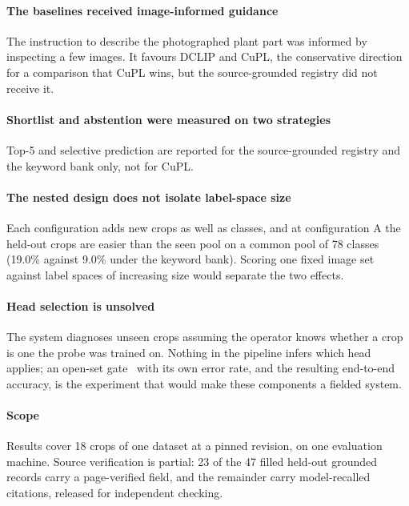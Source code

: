 \documentclass[a4paper,fleqn]{cas-dc}
\begin{document}
\paragraph{The baselines received image-informed guidance} The instruction to describe the photographed
plant part was informed by inspecting a few images. It favours DCLIP and CuPL, the conservative
direction for a comparison that CuPL wins, but the source-grounded registry did not receive it.

\paragraph{Shortlist and abstention were measured on two strategies} Top-5 and selective prediction
are reported for the source-grounded registry and the keyword bank only, not for CuPL.

\paragraph{The nested design does not isolate label-space size} Each configuration adds new crops as
well as classes, and at configuration A the held-out crops are easier than the seen pool on a common
pool of 78 classes (19.0\% against 9.0\% under the keyword bank). Scoring one fixed image set against
label spaces of increasing size would separate the two effects.

\paragraph{Head selection is unsolved} The system diagnoses unseen crops assuming the operator knows
whether a crop is one the probe was trained on. Nothing in the pipeline infers which head applies; an
open-set gate~\citep{scheirer2013openset} with its own error rate, and the resulting end-to-end
accuracy, is the experiment that would make these components a fielded system.

\paragraph{Scope} Results cover 18 crops of one dataset at a pinned revision, on one evaluation
machine. Source verification is partial: 23 of the 47 filled held-out grounded records carry a
page-verified field, and the remainder carry model-recalled citations, released for independent
checking.

\FloatBarrier
\end{document}
